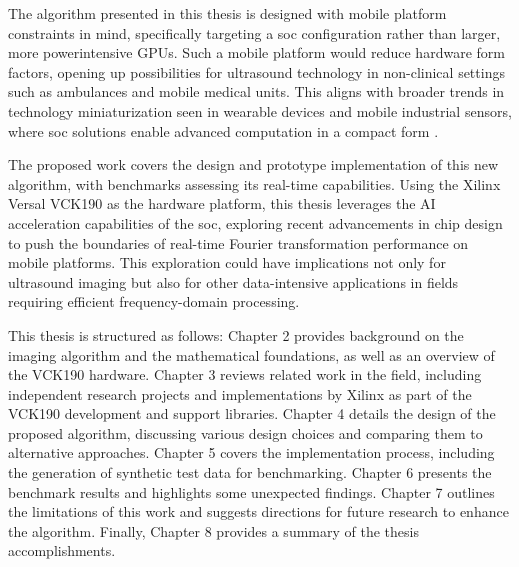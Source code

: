 The algorithm presented in this thesis is designed with mobile platform constraints in mind, specifically targeting a \ac{soc} configuration rather than larger, more powerintensive GPUs. Such a mobile platform would reduce hardware form factors, opening up possibilities for ultrasound technology in non-clinical settings such as ambulances and mobile medical units. This aligns with broader trends in technology miniaturization seen in wearable devices and mobile industrial sensors, where \ac{soc} solutions enable advanced computation in a compact form \cite{michalke_overview_2012, kim_miniaturization_2022}.\par
The proposed work covers the design and prototype implementation of this new algorithm, with benchmarks assessing its real-time capabilities. Using the Xilinx Versal VCK190 as the hardware platform, this thesis leverages the AI acceleration capabilities of the \ac{soc}, exploring recent advancements in chip design to push the boundaries of real-time Fourier transformation performance on mobile platforms. This exploration could have implications not only for ultrasound imaging but also for other data-intensive applications in fields requiring efficient frequency-domain processing.\par
This thesis is structured as follows: Chapter 2 provides background on the imaging algorithm and the mathematical foundations, as well as an overview of the VCK190 hardware. Chapter 3 reviews related work in the field, including independent research projects and implementations by Xilinx as part of the VCK190 development and support libraries. Chapter 4 details the design of the proposed algorithm, discussing various design choices and comparing them to alternative approaches. Chapter 5 covers the implementation process, including the generation of synthetic test data for benchmarking. Chapter 6 presents the benchmark results and highlights some unexpected findings. Chapter 7 outlines the limitations of this work and suggests directions for future research to enhance the algorithm. Finally, Chapter 8 provides a summary of the thesis accomplishments.\par